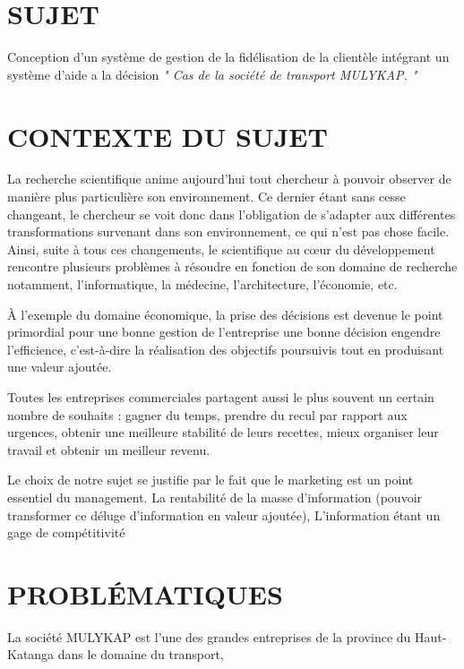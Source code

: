 \documentclass[a4paper,12pt,oneside]{book}
\begin{document}
\section[Sujet]{SUJET}
Conception d’un système de gestion de la fidélisation
de la clientèle intégrant un système d’aide a la décision 
\textit{" Cas de la société de transport MULYKAP. "}
\section[Context du sujet]{CONTEXTE DU SUJET}
La recherche scientifique anime aujourd’hui tout chercheur 
à pouvoir observer de manière
plus particulière son environnement. Ce dernier étant 
sans cesse changeant, le chercheur se voit donc
dans l’obligation de s’adapter aux différentes transformations
survenant dans son environnement, ce qui n’est pas chose facile.
Ainsi, suite à tous ces changements, le scientifique au cœur du
développement rencontre plusieurs problèmes à résoudre en 
fonction de son domaine de recherche notamment, l’informatique,
la médecine, l’architecture, l’économie, etc.
\newline

À l’exemple du domaine
économique, la prise des décisions est devenue
le point primordial pour une bonne gestion de
l’entreprise une bonne décision engendre l’efficience,
c’est-à-dire la réalisation des objectifs
poursuivis tout en produisant une valeur ajoutée.
\newline

Toutes les entreprises commerciales partagent aussi
le plus souvent un certain nombre de souhaits : gagner
du temps, prendre du recul par rapport aux urgences, obtenir une meilleure
stabilité de leurs recettes, mieux organiser leur travail et obtenir un meilleur
revenu. \cite*{Barouch2010}
\newline

Le choix de notre sujet se justifie par le fait que le marketing 
est un point essentiel du management.
La rentabilité de la masse d’information (pouvoir transformer
ce déluge d’information en valeur ajoutée), L’information étant
un gage de compétitivité %
\section[Problématique]{PROBLÉMATIQUES}
La société MULYKAP est l’une des grandes entreprises
de la province du Haut-Katanga dans le domaine du transport,
\end{document}
